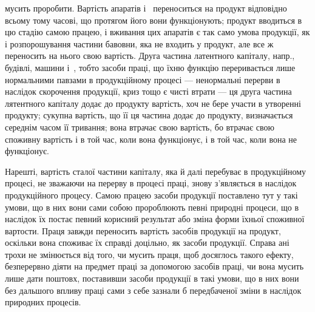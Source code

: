 \parcont{}  %
мусить проробити. Вартість апаратів і~ переноситься на продукт
відповідно всьому тому часові, що протягом його вони функціонують;
продукт вводиться в цю стадію самою працею, і вживання цих апаратів
є так само умова продукції, як і розпорошування частини
бавовни, яка не входить у продукт, але все ж    переносить на нього
свою вартість. Друга частина латентного капіталу, напр., будівлі, машини
і~, тобто засоби праці, що їхню функцію переривається лише
нормальними павзами в продукційному процесі — ненормальні
перерви в наслідок скорочення продукції, криз тощо є чисті
втрати — ця друга частина лятентного капіталу додає до продукту
вартість, хоч не бере участи в утворенні продукту; сукупна вартість, що
її ця частина додає до продукту, визначається середнім часом її тривання;
вона втрачає свою вартість, бо втрачає свою споживну вартість і в той
час, коли вона функціонує, і в той час, коли вона не функціонує.

Нарешті, вартість сталої частини капіталу, яка й далі перебуває в
продукційному процесі, не зважаючи на перерву в процесі праці, знову
з’являється в наслідок продукційного процесу. Самою працею засоби
продукції поставлено тут у такі умови, що в них вони сами собою пророблюють
певні природні процеси, що в наслідок їх постає певний
корисний результат або зміна форми їхньої споживної вартости. Праця
завжди переносить вартість засобів продукції на продукт, оскільки вона
споживає їх справді доцільно, як засоби продукції. Справа ані трохи не
змінюється від того, чи мусить праця, щоб досяглось такого ефекту,
безперервно діяти на предмет праці за допомогою засобів праці, чи вона
мусить лише дати поштовх, поставивши засоби продукції в такі умови,
що в них вони без дальшого впливу праці сами з себе зазнали б
передбаченої зміни в наслідок природних процесів.

